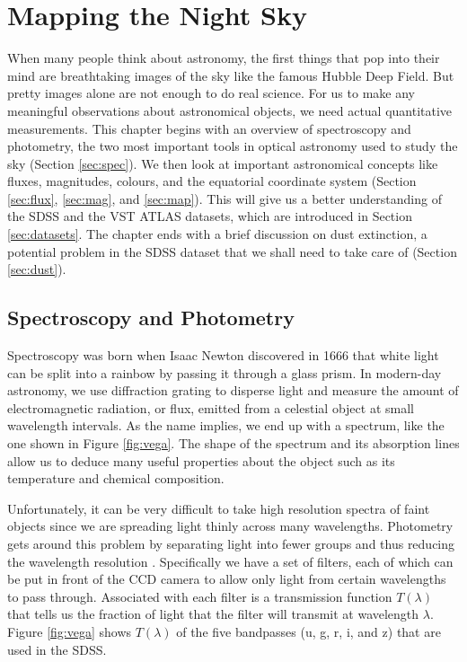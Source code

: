 
\chapter{Mapping the Night Sky}
\label{cha:astro}

When many people think about astronomy, the first things that pop into their mind are breathtaking
images of the sky like the famous Hubble Deep Field. But pretty images alone are not enough to do
real science. For us to make any meaningful observations about astronomical objects, we need actual
quantitative measurements. This chapter begins with an overview of spectroscopy and photometry, the
two most important tools in optical astronomy used to study the sky (Section \ref{sec:spec}).
We then look at important astronomical concepts like fluxes, magnitudes, colours, and the
equatorial coordinate system (Section \ref{sec:flux}, \ref{sec:mag}, and \ref{sec:map}). This will
give us a better understanding of the SDSS and the VST ATLAS datasets, which are introduced in
Section \ref{sec:datasets}. The chapter ends with a brief discussion on dust extinction, a
potential problem in the SDSS dataset that we shall need to take care of (Section \ref{sec:dust}).


\section{Spectroscopy and Photometry}  
\label{sec:spec}

Spectroscopy was born when Isaac Newton discovered in 1666 that white light can be split into a
rainbow by passing it through a glass prism. In modern-day astronomy, we use diffraction grating to
disperse light and measure the amount of electromagnetic radiation, or flux, emitted from a
celestial object at small wavelength intervals. As the name implies, we end up with a spectrum,
like the one shown in Figure \ref{fig:vega}. The shape of the spectrum and its absorption lines
allow us to deduce many useful properties about the object such as its temperature and chemical
composition.

Unfortunately, it can be very difficult to take high resolution spectra of faint objects since we
are spreading light thinly across many wavelengths. Photometry gets around this problem by
separating light into fewer groups and thus reducing the wavelength resolution \cite[Chapter
1]{romanishin02}. Specifically we have a set of filters, each of which can be put in front of the
CCD camera to allow only light from certain wavelengths to pass through. Associated with each
filter is a transmission function $T(\lambda)$ that tells us the fraction of light that the filter
will transmit at wavelength $\lambda$. Figure \ref{fig:vega} shows $T(\lambda)$ of the five
bandpasses (u, g, r, i, and z) that are used in the SDSS.

